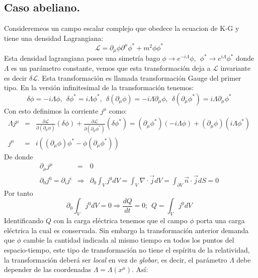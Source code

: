 \subsection{Caso abeliano.}
Consideremeos un campo escalar complejo que obedece la ecuacion de K-G y tiene una densidad Lagrangiana:
\begin{equation}
\mathcal{L}=\partial_{\mu}\phi\partial^{\mu}\phi^{*}+m^{2}\phi\phi^{*}
\end{equation}
Esta densidad lagrangiana posee una simetría bago $\phi\to e^{-i\Lambda}\phi,\ \ \phi^{*}\to e^{i\Lambda}\phi^{*}$ donde $\Lambda$ es un parámetro constante, vemos que esta transformación deja a $\mathcal{L}$ invariante es decir $\delta\mathcal{L}$. Esta transformación es llamada transformación Gauge del primer tipo. En la versión infinitesimal de la transformación tenemos:
\begin{equation}
\delta\phi=-i\Lambda\phi,\ \ \delta\phi^{*}=i\Lambda\phi^{*},\ \ \delta(\partial_{\mu}\phi)=-i\Lambda\partial_{\mu}\phi,\ \ \delta(\partial_{\mu}\phi^{*})=i\Lambda\partial_{\mu}\phi^{*}
\end{equation}
Con esto definimos la corriente $j^{\mu}$ como:
\begin{eqnarray}
\nonumber \Lambda j^{\mu}&=&\frac{\partial\mathcal{L}}{\partial(\partial_{\mu}\phi)}(\delta\phi)+\frac{\partial\mathcal{L}}{\partial(\partial_{\mu}\phi^{*})}(\delta\phi^{*})=(\partial_{\mu}\phi^{*})(-i\Lambda\phi)+(\partial_{\mu}\phi)(i\Lambda\phi^{*})\\
j^\mu &=& i((\partial_{\mu}\phi)\phi^{*}-\phi(\partial_{\mu}\phi^{*}))
\end{eqnarray}
De donde
\begin{eqnarray}
\partial_\mu j^\mu &=& 0\\
\partial_{0}j^{0}=\partial_{i}j^{i}&\Rightarrow &\partial_{0}\int_{V}j^{0}dV=\int_{V}\nabla\cdot\vec{j}dV=\int_{\partial V}\vec{n}\cdot\vec{j}dS=0
\end{eqnarray} 
Por tanto
\begin{equation}
\partial_{0}\int_{V}j^{0}dV=0\Rightarrow\frac{dQ}{dt}=0;\ \ Q=\int_{V}j^{0}dV
\end{equation}
Identificando $Q$ con la carga eléctrica tenemos que el campo $\phi$ porta una carga eléctrica la cual es conservada. Sin embargo la transformación anterior demanda que $\phi$ cambie la cantidad indicada al mismo tiempo en todos los puntos del espacio-tiempo, este tipo de transformación no tiene el espíritu de la relatividad, la transformación deberá ser \textit{local} en vez de \textit{globar}, es decir, el parámetro $\Lambda$ debe depender de las coordenadas $\Lambda=\Lambda(x^\mu)$. Así:
